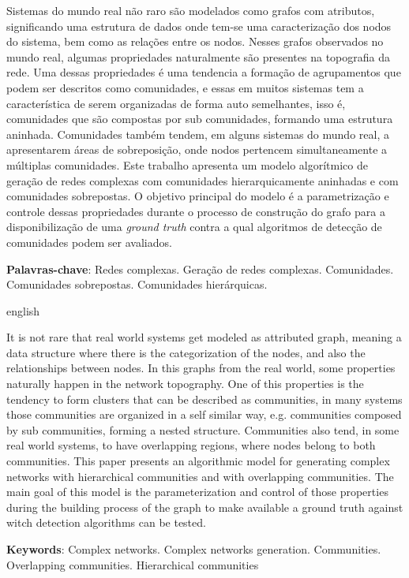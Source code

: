 \documentclass[notes.tex]{subfiles}
\begin{document}
\DoubleSpacing
\begin{resumoumacoluna}
\bigskip

Sistemas do mundo real não raro são modelados como grafos com atributos, significando uma estrutura de dados onde tem-se uma caracterização dos nodos do sistema, bem como as relações entre os nodos.
Nesses grafos observados no mundo real, algumas propriedades naturalmente são presentes na topografia da rede.
Uma dessas propriedades é uma tendencia a formação de agrupamentos que podem ser descritos como comunidades, e essas em muitos sistemas tem a característica de serem organizadas de forma auto semelhantes, isso é, comunidades que são compostas por sub comunidades, formando uma estrutura aninhada.
Comunidades também tendem, em alguns sistemas do mundo real, a apresentarem áreas de sobreposição, onde nodos pertencem simultaneamente a múltiplas comunidades.
Este trabalho apresenta um modelo algorítmico de geração de redes complexas com comunidades hierarquicamente aninhadas e com comunidades sobrepostas.
O objetivo principal do modelo é a parametrização e controle dessas propriedades durante o processo de construção do grafo para a disponibilização de uma \emph{ground truth} contra a qual algoritmos de detecção de comunidades podem ser avaliados.

 \vspace{\onelineskip}

 \noindent
 \textbf{Palavras-chave}: Redes complexas. Geração de redes complexas. Comunidades. Comunidades sobrepostas. Comunidades hierárquicas.
\end{resumoumacoluna}


\renewcommand{\resumoname}{Abstract}
\begin{resumoumacoluna}
 \begin{otherlanguage*}{english}
\bigskip

It is not rare that real world systems get modeled as attributed graph, meaning a data structure where there is the categorization of the nodes, and also the relationships between nodes.
In this graphs from the real world, some properties naturally happen in the network topography.
One of this properties is the tendency to form clusters that can be described as communities, in many systems those communities are organized in a self similar way, e.g. communities composed by sub communities, forming a nested structure.
Communities also tend, in some real world systems, to have overlapping regions, where nodes belong to both communities.
This paper presents an algorithmic model for generating complex networks with hierarchical communities and with overlapping communities.
The main goal of this model is the parameterization and control of those properties during the building process of the graph to make available a ground truth against witch detection algorithms can be tested.

   \vspace{\onelineskip}

   \noindent
   \textbf{Keywords}: Complex networks. Complex networks generation. Communities. Overlapping communities. Hierarchical communities
 \end{otherlanguage*}
\end{resumoumacoluna}
\end{document}

